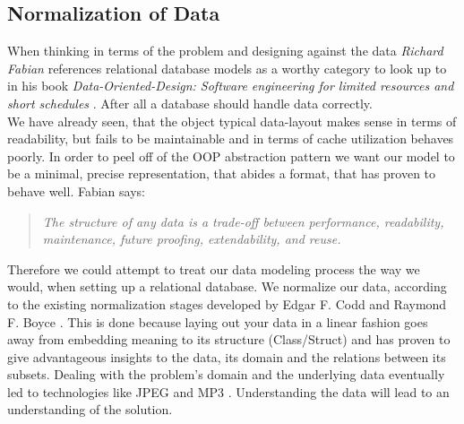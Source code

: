 \subsection{Normalization of Data}
When thinking in terms of the problem and designing against the data \textit{Richard Fabian} references relational database models as a worthy category to look up to in his book \textit{Data-Oriented-Design: Software engineering for limited resources and short schedules} . After all a database should handle data correctly.\\
We have already seen, that the object typical data-layout makes sense in terms of readability, but fails to be maintainable and in terms of cache utilization behaves poorly. In order to peel off of the OOP abstraction pattern we want our model to be a minimal, precise representation, that abides a format, that has proven to behave well. Fabian says:
\begin{quote}
	\textit{The structure of any data is a trade-off between performance, readability, maintenance, future proofing, extendability, and reuse.} 
\end{quote}
Therefore we could attempt to treat our data modeling process the way we would, when setting up a relational database. We normalize our data, according to the existing normalization stages developed by Edgar F. Codd and Raymond F. Boyce . This is done because laying out your data in a linear fashion goes away from embedding meaning to its structure (Class/Struct)  and has proven to give advantageous insights to the data, its domain and the relations between its subsets. Dealing with the problem's domain and the underlying data eventually led to technologies like JPEG and MP3 . Understanding the data will lead to an understanding of the solution.
\begin{table}[H]
	\centering
\end{table}
